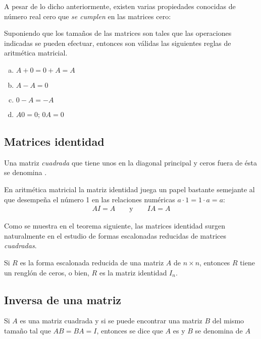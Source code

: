 \documentclass[a4paper,12pt]{article}
\begin{document}
A pesar de lo dicho anteriormente, existen varias propiedades conocidas de
número real cero que \emph{se cumplen} en las matrices cero:
\begin{theorem}
  Suponiendo que los tamaños de las matrices son tales que las operaciones
  indicadas se pueden efectuar, entonces son válidas las siguientes reglas de
  aritmética matricial.
  \begin{enumerate}[(a)]
    \item $A+0=0+A=A$
    \item $A-A=0$
    \item $0-A=-A$
    \item $A0=0$; $0A=0$
  \end{enumerate}
  \label{theo:cero}
\end{theorem}

\subsection{Matrices identidad}

\begin{concept}
  Una matriz \textit{cuadrada} que tiene unos en la diagonal principal y ceros
  fuera de ésta se denomina .
\end{concept}

En aritmética matricial la matriz identidad juega un papel bastante semejante
al que desempeña el número 1 en las relaciones numéricas $a\cdot1=1\cdot a=a$:
\begin{align*}
  AI=A \qquad \mbox{y} \qquad IA=A
\end{align*}

Como se muestra en el teorema siguiente, las matrices identidad surgen
naturalmente en el estudio de formas escalonadas reducidas de matrices
\emph{cuadradas}.

\begin{theorem}
  Si $R$ es la forma escalonada reducida de una matriz $A$ de $n\times n$,
  entonces $R$ tiene un renglón de ceros, o bien, $R$ es la matriz identidad
  $I_n$.
\end{theorem}

\subsection{Inversa de una matriz}

\begin{concept}
  Si $A$ es una matriz cuadrada y si se puede encontrar una matriz $B$ del
  mismo tamaño tal que $AB=BA=I$, entonces se dice que $A$ es
   y $B$ se denomina  de $A$
\end{concept}
\end{document}
